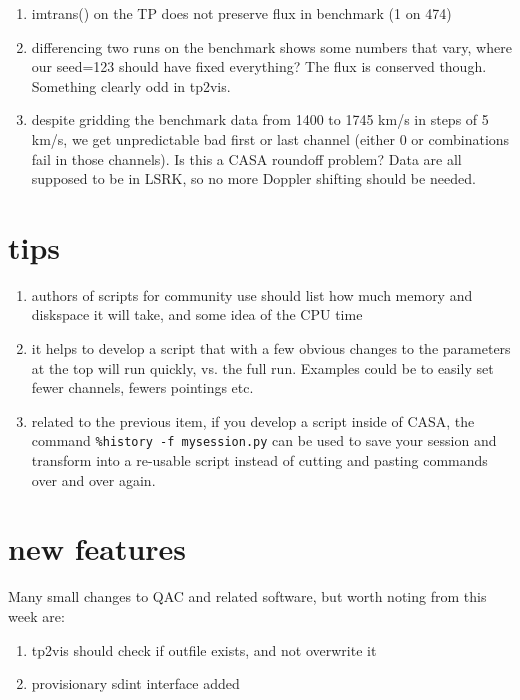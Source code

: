 \documentclass[12pt,a4paper]{article}
\begin{document}
\begin{enumerate}

\item imtrans() on the TP does not preserve flux in benchmark (1 on 474)
\item differencing two runs on the benchmark shows some numbers that vary, where our seed=123 should have fixed everything?
  The flux is conserved though. Something clearly odd in tp2vis.
\item despite gridding the benchmark data from 1400 to 1745 km/s in steps of 5 km/s, we get unpredictable bad first or last channel
  (either 0 or combinations fail in those channels). Is this a CASA roundoff problem?  Data are all supposed to be in LSRK, so no more
  Doppler shifting should be needed.

\end{enumerate}

\section{tips}

\begin{enumerate}

\item authors of scripts for community use should list how much memory and diskspace it will take, and some idea of the CPU time

\item it helps to develop a script that with a few obvious changes to the parameters at the top will run quickly, vs. the full run.
  Examples could be to easily set fewer channels, fewers pointings etc.

\item related to the previous item,
  if you develop a script inside of CASA, the command \verb+%history -f mysession.py+ can be used to save your session and
  transform into a re-usable script instead of cutting and pasting commands over and over again.
  
\end{enumerate}


\section{new features}

Many small changes to QAC and related software, but worth noting
from this week are:

\begin{enumerate}

\item tp2vis should check if outfile exists, and not overwrite it

\item provisionary sdint interface added 
  
\end{enumerate}
\end{document}
